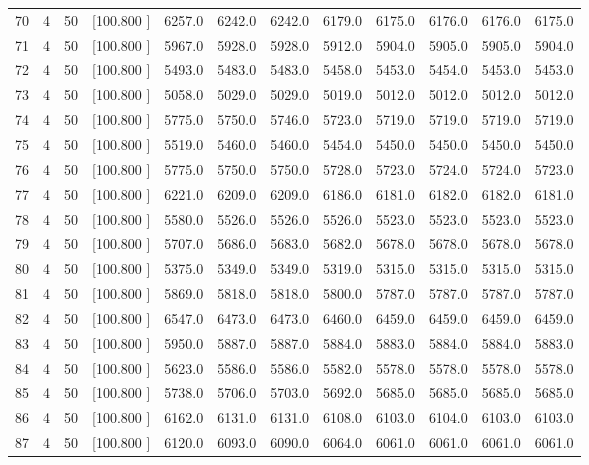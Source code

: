 \documentclass[12pt,a4paper]{article}
\begin{document}
\begin{center}
{\begin{tabular}{r r r r r r r r r r r r}
  70&  4& 50&[100.800   ]&  6257.0&  6242.0&  6242.0&  6179.0&  6175.0&  6176.0&  6176.0&  6175.0\\[-0.02in]
  71&  4& 50&[100.800   ]&  5967.0&  5928.0&  5928.0&  5912.0&  5904.0&  5905.0&  5905.0&  5904.0\\[-0.02in]
  72&  4& 50&[100.800   ]&  5493.0&  5483.0&  5483.0&  5458.0&  5453.0&  5454.0&  5453.0&  5453.0\\[-0.02in]
  73&  4& 50&[100.800   ]&  5058.0&  5029.0&  5029.0&  5019.0&  5012.0&  5012.0&  5012.0&  5012.0\\[-0.02in]
  74&  4& 50&[100.800   ]&  5775.0&  5750.0&  5746.0&  5723.0&  5719.0&  5719.0&  5719.0&  5719.0\\[-0.02in]
  75&  4& 50&[100.800   ]&  5519.0&  5460.0&  5460.0&  5454.0&  5450.0&  5450.0&  5450.0&  5450.0\\[-0.02in]
  76&  4& 50&[100.800   ]&  5775.0&  5750.0&  5750.0&  5728.0&  5723.0&  5724.0&  5724.0&  5723.0\\[-0.02in]
  77&  4& 50&[100.800   ]&  6221.0&  6209.0&  6209.0&  6186.0&  6181.0&  6182.0&  6182.0&  6181.0\\[-0.02in]
  78&  4& 50&[100.800   ]&  5580.0&  5526.0&  5526.0&  5526.0&  5523.0&  5523.0&  5523.0&  5523.0\\[-0.02in]
  79&  4& 50&[100.800   ]&  5707.0&  5686.0&  5683.0&  5682.0&  5678.0&  5678.0&  5678.0&  5678.0\\[-0.02in]
  80&  4& 50&[100.800   ]&  5375.0&  5349.0&  5349.0&  5319.0&  5315.0&  5315.0&  5315.0&  5315.0\\[-0.02in]
  81&  4& 50&[100.800   ]&  5869.0&  5818.0&  5818.0&  5800.0&  5787.0&  5787.0&  5787.0&  5787.0\\[-0.02in]
  82&  4& 50&[100.800   ]&  6547.0&  6473.0&  6473.0&  6460.0&  6459.0&  6459.0&  6459.0&  6459.0\\[-0.02in]
  83&  4& 50&[100.800   ]&  5950.0&  5887.0&  5887.0&  5884.0&  5883.0&  5884.0&  5884.0&  5883.0\\[-0.02in]
  84&  4& 50&[100.800   ]&  5623.0&  5586.0&  5586.0&  5582.0&  5578.0&  5578.0&  5578.0&  5578.0\\[-0.02in]
  85&  4& 50&[100.800   ]&  5738.0&  5706.0&  5703.0&  5692.0&  5685.0&  5685.0&  5685.0&  5685.0\\[-0.02in]
  86&  4& 50&[100.800   ]&  6162.0&  6131.0&  6131.0&  6108.0&  6103.0&  6104.0&  6103.0&  6103.0\\[-0.02in]
  87&  4& 50&[100.800   ]&  6120.0&  6093.0&  6090.0&  6064.0&  6061.0&  6061.0&  6061.0&  6061.0\\[-0.02in]

\end{tabular}}
\end{center}
\end{document}

